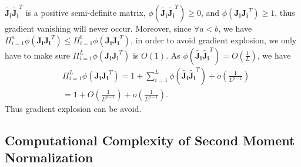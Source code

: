 \documentclass[10pt,journal,compsoc]{IEEEtran}
\begin{document}
$\widetilde{\mathbf{J_i}}\widetilde{\mathbf{J_i}}^T$ is a positive semi-definite matrix, $\phi(\widetilde{\mathbf{J_i}}\widetilde{\mathbf{J_i}}^T)\ge 0$, and $\phi(\mathbf{J_iJ_i}^T)\ge 1$, thus gradient vanishing will never occur. Moreover, since $\forall a<b$, we have $\Pi_{i=1}^a\phi(\mathbf{J_iJ_i}^T)\le\Pi_{i=1}^b\phi(\mathbf{J_iJ_i}^T)$, in order to avoid gradient explosion, we only have to make sure $\Pi_{i=1}^L\phi(\mathbf{J_iJ_i}^T)$ is $O(1)$. As $\phi(\widetilde{\mathbf{J_i}}\widetilde{\mathbf{J_i}}^T) = O(\frac{1}{L})$, we have
\begin{equation}
\begin{split}
    & \Pi_{i=1}^L\phi(\mathbf{J_iJ_i}^T) = 1 + \sum_{i=1}^L\phi(\widetilde{\mathbf{J_i}}\widetilde{\mathbf{J_i}}^T) + o(\frac{1}{L^{p-1}})\\
    & = 1 + O(\frac{1}{L^{p-1}})+ o(\frac{1}{L^{p-1}}).
\end{split}
\end{equation}
Thus gradient explosion can be avoid.
 
%
 \subsection{Computational Complexity of Second Moment Normalization}
\end{document}
